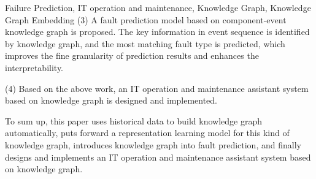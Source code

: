 \begin{englishabstract}{Failure Prediction, IT operation and maintenance, Knowledge Graph, Knowledge Graph Embedding}
(3) A fault prediction model based on component-event knowledge graph is proposed. The key information in event sequence is identified by knowledge graph, and the most matching fault type is predicted, which improves the fine granularity of prediction results and enhances the interpretability. 

(4) Based on the above work, an IT operation and maintenance assistant system based on knowledge graph is designed and implemented. 
    
To sum up, this paper uses historical data to build knowledge graph automatically, puts forward a representation learning model for this kind of knowledge graph, introduces knowledge graph into fault prediction, and finally designs and implements an IT operation and maintenance assistant system based on knowledge graph.
\end{englishabstract}
\tableofcontents
\listofothers

      
